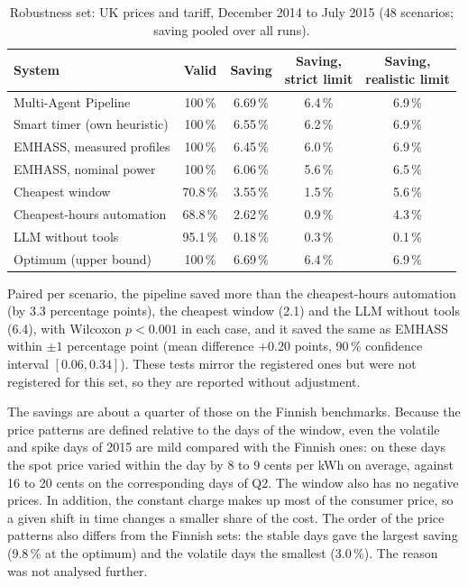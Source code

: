 \begin{table}[h!]
\caption{Robustness set: UK prices and tariff, December 2014 to July 2015 (48 scenarios; saving pooled over all runs).}
\label{tab:uk-systems}
\small
\begin{tabularx}{\textwidth}{>{\raggedright\arraybackslash}Xcccc}
\toprule
System & Valid & Saving & \makecell{Saving,\\strict limit} & \makecell{Saving,\\realistic limit} \\
\midrule
Multi-Agent Pipeline & 100\,\% & 6.69\,\% & 6.4\,\% & 6.9\,\% \\
Smart timer (own heuristic) & 100\,\% & 6.55\,\% & 6.2\,\% & 6.9\,\% \\
EMHASS, measured profiles & 100\,\% & 6.45\,\% & 6.0\,\% & 6.9\,\% \\
EMHASS, nominal power & 100\,\% & 6.06\,\% & 5.6\,\% & 6.5\,\% \\
Cheapest window & 70.8\,\% & 3.55\,\% & 1.5\,\% & 5.6\,\% \\
Cheapest-hours automation & 68.8\,\% & 2.62\,\% & 0.9\,\% & 4.3\,\% \\
LLM without tools & 95.1\,\% & 0.18\,\% & 0.3\,\% & 0.1\,\% \\
\midrule
Optimum (upper bound) & 100\,\% & 6.69\,\% & 6.4\,\% & 6.9\,\% \\
\bottomrule
\end{tabularx}
\end{table}

Paired per scenario, the pipeline saved more than the cheapest-hours
automation (by 3.3 percentage points), the cheapest window (2.1) and the
LLM without tools (6.4), with Wilcoxon $p < 0.001$ in each case, and it
saved the same as EMHASS within $\pm 1$ percentage point (mean difference
$+0.20$ points, 90\,\% confidence interval $[0.06, 0.34]$). These tests
mirror the registered ones but were not registered for this set, so they
are reported without adjustment.

The savings are about a quarter of those on the Finnish benchmarks.
Because the price patterns are defined relative to the days of the
window, even the volatile and spike days of 2015 are mild compared with
the Finnish ones: on these days the spot price varied within the day by
8 to 9 cents per kWh on average, against 16 to 20 cents on the
corresponding days of Q2. The window also has no negative prices. In addition,
the constant charge makes up most of the consumer price, so a given
shift in time changes a smaller share of the cost. The order of the
price patterns also differs from the Finnish sets: the stable days gave
the largest saving (9.8\,\% at the optimum) and the volatile days the
smallest (3.0\,\%). The reason was not analysed further.

